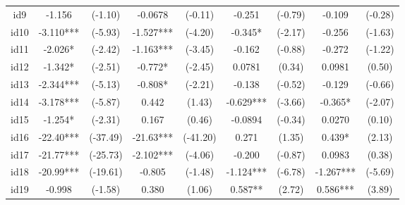 \documentclass[entropy,article,submit,moreauthors,LaTeX and dvi2pdf]{Definitions/mdpi}
\begin{document}
\begin{center}
\begin{longtable}{ccccccccc}
id9                                           & -1.156        & (-1.10)       & -0.0678         & (-0.11)          & -0.251            & (-0.79)           & -0.109            & (-0.28)           \\
id10                                          & -3.110***     & (-5.93)       & -1.527***       & (-4.20)          & -0.345*           & (-2.17)           & -0.256            & (-1.63)           \\
id11                                          & -2.026*       & (-2.42)       & -1.163***       & (-3.45)          & -0.162            & (-0.88)           & -0.272            & (-1.22)           \\
id12                                          & -1.342*       & (-2.51)       & -0.772*         & (-2.45)          & 0.0781            & (0.34)            & 0.0981            & (0.50)            \\
id13                                          & -2.344***     & (-5.13)       & -0.808*         & (-2.21)          & -0.138            & (-0.52)           & -0.129            & (-0.66)           \\
id14                                          & -3.178***     & (-5.87)       & 0.442           & (1.43)           & -0.629***         & (-3.66)           & -0.365*           & (-2.07)           \\
id15                                          & -1.254*       & (-2.31)       & 0.167           & (0.46)           & -0.0894           & (-0.34)           & 0.0270            & (0.10)            \\
id16                                          & -22.40***     & (-37.49)      & -21.63***       & (-41.20)         & 0.271             & (1.35)            & 0.439*            & (2.13)            \\
id17                                          & -21.77***     & (-25.73)      & -2.102***       & (-4.06)          & -0.200            & (-0.87)           & 0.0983            & (0.38)            \\
id18                                          & -20.99***     & (-19.61)      & -0.805          & (-1.48)          & -1.124***         & (-6.78)           & -1.267***         & (-5.69)           \\
id19                                          & -0.998        & (-1.58)       & 0.380           & (1.06)           & 0.587**           & (2.72)            & 0.586***          & (3.89)            \\

\end{longtable}
\end{center}
\end{document}

